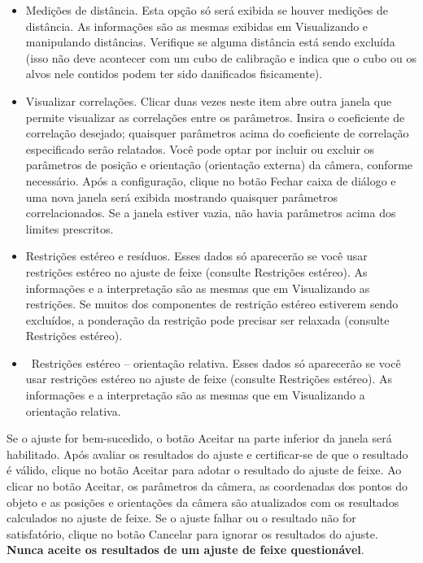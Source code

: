 \documentclass[
  12pt,
  letterpaper,
  DIV=11,
  numbers=noendperiod]{scrreprt}
\providecommand{\tightlist}{%
  \setlength{\itemsep}{0pt}\setlength{\parskip}{0pt}}
\begin{document}
\begin{itemize}
\tightlist
\item
  Medições de distância. Esta opção só será exibida se houver medições
  de distância. As informações são as mesmas exibidas em Visualizando e
  manipulando distâncias. Verifique se alguma distância está sendo
  excluída (isso não deve acontecer com um cubo de calibração e indica
  que o cubo ou os alvos nele contidos podem ter sido danificados
  fisicamente).
\end{itemize}

\begin{itemize}
\tightlist
\item
  Visualizar correlações. Clicar duas vezes neste item abre outra janela
  que permite visualizar as correlações entre os parâmetros. Insira o
  coeficiente de correlação desejado; quaisquer parâmetros acima do
  coeficiente de correlação especificado serão relatados. Você pode
  optar por incluir ou excluir os parâmetros de posição e orientação
  (orientação externa) da câmera, conforme necessário. Após a
  configuração, clique no botão Fechar caixa de diálogo e uma nova
  janela será exibida mostrando quaisquer parâmetros correlacionados. Se
  a janela estiver vazia, não havia parâmetros acima dos limites
  prescritos.
\end{itemize}

\begin{itemize}
\tightlist
\item
  Restrições estéreo e resíduos. Esses dados só aparecerão se você usar
  restrições estéreo no ajuste de feixe (consulte Restrições estéreo).
  As informações e a interpretação são as mesmas que em Visualizando as
  restrições. Se muitos dos componentes de restrição estéreo estiverem
  sendo excluídos, a ponderação da restrição pode precisar ser relaxada
  (consulte Restrições estéreo).
\end{itemize}

\begin{itemize}
\tightlist
\item
  ~Restrições estéreo -- orientação relativa. Esses dados só aparecerão
  se você usar restrições estéreo no ajuste de feixe (consulte
  Restrições estéreo). As informações e a interpretação são as mesmas
  que em Visualizando a orientação relativa.
\end{itemize}

Se o ajuste for bem-sucedido, o botão Aceitar na parte inferior da
janela será habilitado. Após avaliar os resultados do ajuste e
certificar-se de que o resultado é válido, clique no botão Aceitar para
adotar o resultado do ajuste de feixe. Ao clicar no botão Aceitar, os
parâmetros da câmera, as coordenadas dos pontos do objeto e as posições
e orientações da câmera são atualizados com os resultados calculados no
ajuste de feixe. Se o ajuste falhar ou o resultado não for satisfatório,
clique no botão Cancelar para ignorar os resultados do ajuste.
\textbf{Nunca aceite os resultados de um ajuste de feixe questionável}.
\end{document}
